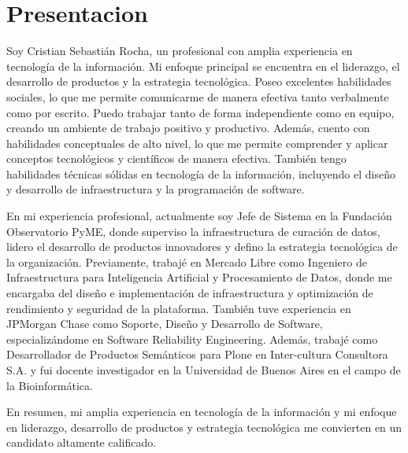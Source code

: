 \section{Presentacion}

Soy Cristian Sebastián Rocha, un profesional con amplia experiencia en tecnología de la información. Mi enfoque principal se encuentra en el liderazgo, el desarrollo de productos y la estrategia tecnológica. Poseo excelentes habilidades sociales, lo que me permite comunicarme de manera efectiva tanto verbalmente como por escrito. Puedo trabajar tanto de forma independiente como en equipo, creando un ambiente de trabajo positivo y productivo. Además, cuento con habilidades conceptuales de alto nivel, lo que me permite comprender y aplicar conceptos tecnológicos y científicos de manera efectiva. También tengo habilidades técnicas sólidas en tecnología de la información, incluyendo el diseño y desarrollo de infraestructura y la programación de software.

En mi experiencia profesional, actualmente soy Jefe de Sistema en la Fundación Observatorio PyME, donde superviso la infraestructura de curación de datos, lidero el desarrollo de productos innovadores y defino la estrategia tecnológica de la organización. Previamente, trabajé en Mercado Libre como Ingeniero de Infraestructura para Inteligencia Artificial y Procesamiento de Datos, donde me encargaba del diseño e implementación de infraestructura y optimización de rendimiento y seguridad de la plataforma. También tuve experiencia en JPMorgan Chase como Soporte, Diseño y Desarrollo de Software, especializándome en Software Reliability Engineering. Además, trabajé como Desarrollador de Productos Semánticos para Plone en Inter-cultura Consultora S.A. y fui docente investigador en la Universidad de Buenos Aires en el campo de la Bioinformática.

En resumen, mi amplia experiencia en tecnología de la información y mi enfoque en liderazgo, desarrollo de productos y estrategia tecnológica me convierten en un candidato altamente calificado.

